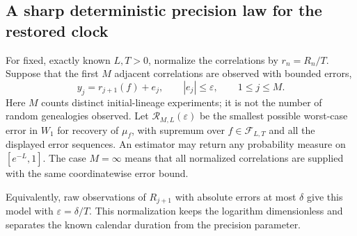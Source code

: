 \documentclass[11pt]{article}
\theoremstyle{definition}
\theoremstyle{remark}
\numberwithin{equation}{section}
\begin{document}
\subsection{A sharp deterministic precision law for the restored clock}
\label{restore:noisysection}

For fixed, exactly known $L,T>0$, normalize the correlations by
$r_n=R_n/T$.  Suppose that the first $M$ adjacent correlations are
observed with bounded errors,
\[
       y_j=r_{j+1}(f)+e_j,\qquad |e_j|\le\varepsilon,
                              \qquad 1\le j\le M.
\]
Here $M$ counts distinct initial-lineage experiments; it is not the
number of random genealogies observed.  Let $\mathcal R_{M,L}(\varepsilon)$
be the smallest possible worst-case error in $W_1$ for recovery of
$\mu_f$, with supremum over $f\in\mathcal F_{L,T}$ and all the displayed
error sequences.  An estimator may return any probability measure on
$[e^{-L},1]$.  The case $M=\infty$ means that all normalized correlations
are supplied with the same coordinatewise error bound.

Equivalently, raw observations of $R_{j+1}$ with absolute errors at most
$\delta$ give this model with $\varepsilon=\delta/T$.  This normalization
keeps the logarithm dimensionless and separates the known calendar
duration from the precision parameter.
\end{document}
